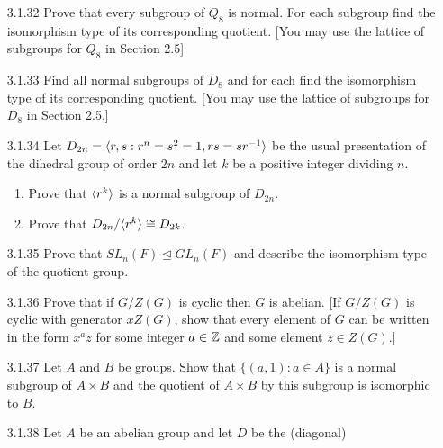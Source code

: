 \begin{enumerate}
   \item[3.1.32]  Prove that every subgroup of $Q_8$ is normal. For each
                  subgroup find the isomorphism type of its corresponding
                  quotient. [You may use the lattice of subgroups for $Q_8$ in
                  Section 2.5]
   \item[3.1.33]  Find all normal subgroups of $D_8$ and for each find the
                  isomorphism type of its corresponding quotient. [You may use
                  the lattice of subgroups for $D_8$ in Section 2.5.]
   \item[3.1.34]  Let $D_{2n} = \langle r, s : r^n = s^2 = 1, rs = sr^{-1} \rangle$ be the
                  usual presentation of the dihedral group of order $2n$ and let
                  $k$ be a positive integer dividing $n$.
                  \begin{enumerate}
                     \item Prove that $\langle r^k \rangle$ is a normal subgroup of
                           $D_{2n}$.
                     \item Prove that $D_{2n}/\langle r^k \rangle \cong D_{2k}$.
                  \end{enumerate}
   \item[3.1.35]  Prove that $SL_n(F) \trianglelefteq GL_n(F)$ and describe the
                  isomorphism type of the quotient group.
   \item[3.1.36]  Prove that if $G/Z(G)$ is cyclic then $G$ is abelian. [If
                  $G/Z(G)$ is cyclic with generator $xZ(G)$, show that every
                  element of $G$ can be written in the form $x^az$ for some
                  integer $a \in \mathbb{Z}$ and some element $z \in Z(G)$.]
   \item[3.1.37]  Let $A$ and $B$ be groups. Show that $\{(a, 1) : a \in A\}$ is
                  a normal subgroup of $A \times B$ and the quotient of
                  $A \times B$ by this subgroup is isomorphic to $B$.
   \item[3.1.38]  Let $A$ be an abelian group and let $D$ be the (diagonal)

\end{enumerate}
